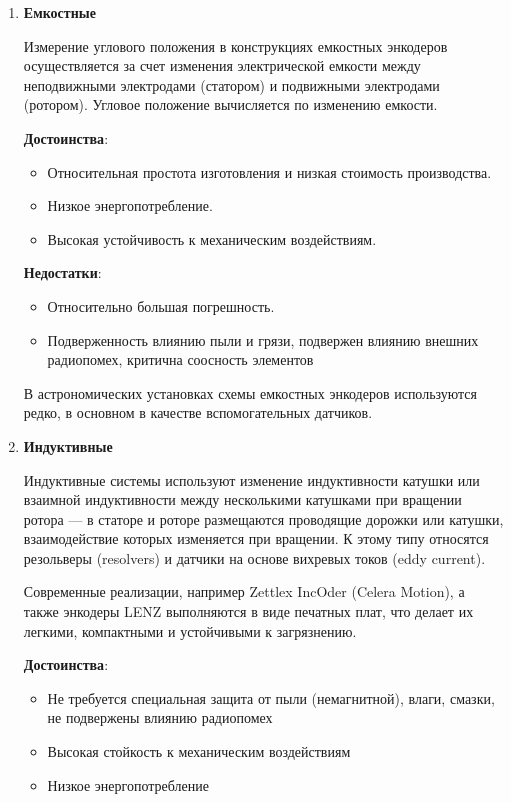 \begin{enumerate}

\item \textbf{Емкостные}

Измерение углового положения в конструкциях емкостных энкодеров осуществляется за счет изменения электрической емкости между неподвижными электродами (статором) и подвижными электродами (ротором). Угловое положение вычисляется по изменению емкости.

\textbf{Достоинства}:
\begin{itemize}
    \item Относительная простота изготовления и низкая стоимость производства.
    \item Низкое энергопотребление.
    \item Высокая устойчивость к механическим воздействиям.
\end{itemize}

\textbf{Недостатки}:
\begin{itemize}
    \item Относительно большая погрешность.
    \item Подверженность влиянию пыли и грязи, подвержен влиянию внешних радиопомех, критична соосность элементов
\end{itemize}

В астрономических установках схемы емкостных энкодеров используются редко, в основном в качестве вспомогательных датчиков.  

\item \textbf{Индуктивные}  

Индуктивные системы используют изменение индуктивности катушки или взаимной индуктивности между несколькими катушками при вращении ротора --- в статоре и роторе размещаются проводящие дорожки или катушки, взаимодействие которых изменяется при вращении. К этому типу относятся резольверы (resolvers) и датчики на основе вихревых токов (eddy current).

Современные реализации, например Zettlex IncOder (Celera Motion), а также энкодеры LENZ выполняются в виде печатных плат, что делает их легкими, компактными и устойчивыми к загрязнению.

\textbf{Достоинства}:
\begin{itemize}
    \item Не требуется специальная защита от пыли (немагнитной), влаги, смазки, не подвержены влиянию радиопомех
    \item Высокая стойкость к механическим воздействиям
    \item Низкое энергопотребление
\end{itemize}


\end{enumerate}
